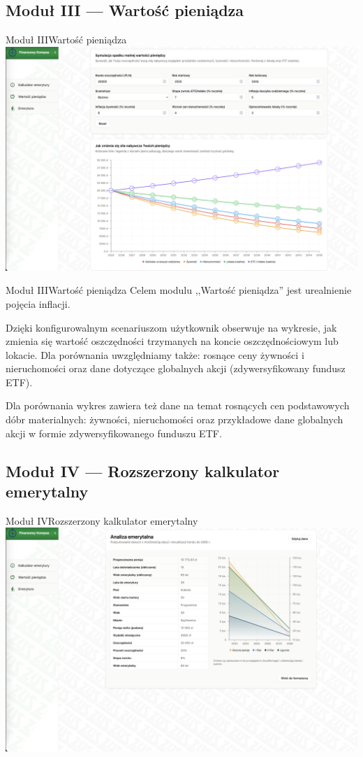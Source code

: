 \subsection{Moduł III --- Wartość pieniądza}

\begin{frame}[t]{Moduł III}{Wartość pieniądza}
  \includegraphics[width=.8\textwidth]{img/module_3_the_value_of_money}
\end{frame}

\begin{frame}[t]{Moduł III}{Wartość pieniądza}
Celem modulu ,,Wartość pieniądza'' jest urealnienie pojęcia inflacji.

\pause
Dzięki konfigurowalnym scenariuszom użytkownik obserwuje na wykresie,
jak zmienia się wartość oszczędności trzymanych na koncie oszczędnościowym lub lokacie.
\pause
Dla porównania uwzględniamy także: rosnące ceny żywności i nieruchomości
oraz dane dotyczące globalnych akcji (zdywersyfikowany fundusz ETF).


\pause Dla porównania wykres zawiera też dane
na temat rosnących cen podstawowych dóbr materialnych: żywności, nieruchomości
oraz przykładowe dane globalnych akcji w formie zdywersyfikowanego funduszu ETF.
\end{frame}

\subsection{Moduł IV --- Rozszerzony kalkulator emerytalny}

\begin{frame}[t]{Moduł IV}{Rozszerzony kalkulator emerytalny}
  \includegraphics[width=.8\textwidth]{img/module_4_extended_pension_calculator}
\end{frame}

